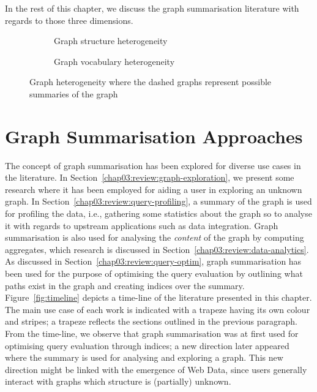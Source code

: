 In the rest of this chapter, we discuss the graph summarisation literature with regards to those three dimensions.

\begin{figure}
	\centering
	\begin{subfigure}{.5\textwidth}
		\resizebox{\textwidth}{!}{
			
		}
		\caption{Graph structure heterogeneity}
		\label{fig:hetero-struct}
	\end{subfigure}
	\qquad
	\begin{subfigure}{.42\textwidth}
		\resizebox{\textwidth}{!}{
			
		}
		\caption{Graph vocabulary heterogeneity}
		\label{fig:hetero-voc}
	\end{subfigure}
	\caption{Graph heterogeneity where the dashed graphs represent possible summaries of the graph}
	\label{fig:graph-hetero}
\end{figure}

\section{Graph Summarisation Approaches}

The concept of graph summarisation has been explored for diverse use cases in the literature. In Section~\ref{chap03:review:graph-exploration}, we present some research where it has been employed for aiding a user in exploring an unknown graph. In Section~\ref{chap03:review:query-profiling}, a summary of the graph is used for profiling the data, i.e., gathering some statistics about the graph so to analyse it with regards to upstream applications such as data integration. Graph summarisation is also used for analysing the \emph{content} of the graph by computing aggregates, which research is discussed in Section~\ref{chap03:review:data-analytics}. As discussed in Section~\ref{chap03:review:query-optim}, graph summarisation has been used for the purpose of optimising the query evaluation by outlining what paths exist in the graph and creating indices over the summary.\\

Figure~\ref{fig:timeline} depicts a time-line of the literature presented in this chapter. The main use case of each work is indicated with a trapeze having its own colour and stripes; a trapeze reflects the sections outlined in the previous paragraph. From the time-line, we observe that graph summarisation was at first used for optimising query evaluation through indices; a new direction later appeared where the summary is used for analysing and exploring a graph. This new direction might be linked with the emergence of Web Data, since users generally interact with graphs which structure is (partially) unknown.

